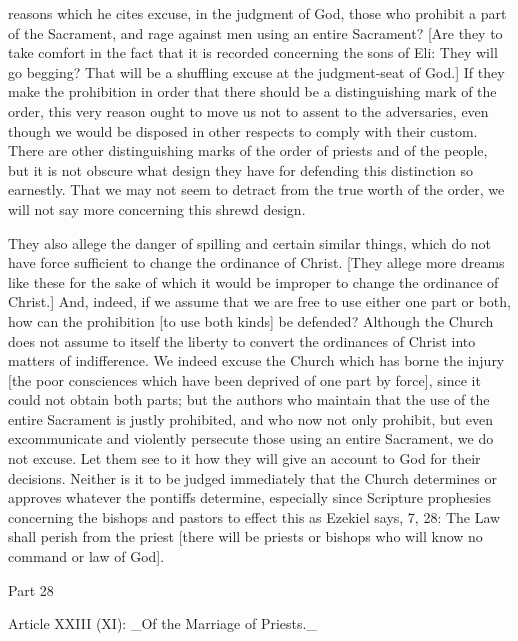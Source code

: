 reasons which he cites excuse, in the judgment of God, those who
prohibit a part of the Sacrament, and rage against men using an
entire Sacrament?  [Are they to take comfort in the fact that it is
recorded concerning the sons of Eli: They will go begging?  That will
be a shuffling excuse at the judgment-seat of God.] If they make the
prohibition in order that there should be a distinguishing mark of
the order, this very reason ought to move us not to assent to the
adversaries, even though we would be disposed in other respects to
comply with their custom.  There are other distinguishing marks of
the order of priests and of the people, but it is not obscure what
design they have for defending this distinction so earnestly.  That
we may not seem to detract from the true worth of the order, we will
not say more concerning this shrewd design.

They also allege the danger of spilling and certain similar things,
which do not have force sufficient to change the ordinance of Christ.
[They allege more dreams like these for the sake of which it would
be improper to change the ordinance of Christ.] And, indeed, if we
assume that we are free to use either one part or both, how can the
prohibition [to use both kinds] be defended?  Although the Church
does not assume to itself the liberty to convert the ordinances of
Christ into matters of indifference.  We indeed excuse the Church
which has borne the injury [the poor consciences which have been
deprived of one part by force], since it could not obtain both parts;
but the authors who maintain that the use of the entire Sacrament is
justly prohibited, and who now not only prohibit, but even
excommunicate and violently persecute those using an entire Sacrament,
we do not excuse.  Let them see to it how they will give an account
to God for their decisions.  Neither is it to be judged immediately
that the Church determines or approves whatever the pontiffs
determine, especially since Scripture prophesies concerning the
bishops and pastors to effect this as Ezekiel says, 7, 28: The Law
shall perish from the priest [there will be priests or bishops who
will know no command or law of God].




Part 28


Article XXIII (XI): _Of the Marriage of Priests._


